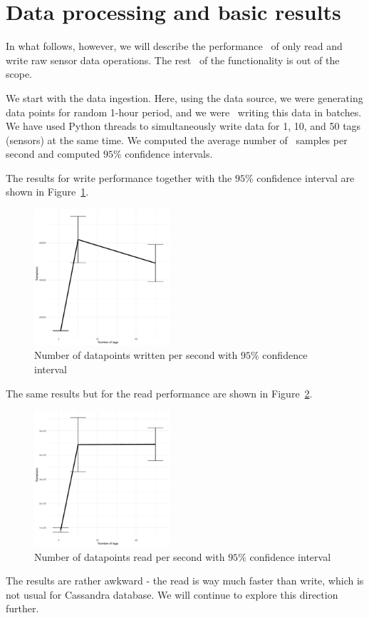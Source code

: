 \section{Data processing and basic results}
\label{section:results}


In what follows, however, we will describe the performance 
of only read and write raw sensor data operations. The rest 
of the functionality is out of the scope.

We start with the data ingestion. Here, using the data source,
we were generating data points for random 1-hour period, and we were 
writing this data in batches. We have used Python threads
to simultaneously write data for 1, 10, and 50 tags (sensors)
at the same time. We computed the average number of 
samples per second and computed $95\%$ confidence intervals.

The results for write performance together with the $95\%$ confidence 
interval are shown in Figure~\ref{fig:write}. 

\begin{figure}[!hbt]\centering
  \includegraphics[width=0.45\textwidth]{graphics/write.pdf}
  \caption{Number of datapoints written per second with $95\%$ confidence interval}
  \label{fig:write}
\end{figure}

The same results but for the read performance are shown in Figure~\ref{fig:read}.

\begin{figure}[!hbt]\centering
  \includegraphics[width=0.45\textwidth]{graphics/read.pdf}
  \caption{Number of datapoints read per second with $95\%$ confidence interval}
  \label{fig:read}
\end{figure}

The results are rather awkward - the read is way much faster than write, which is not
usual for Cassandra database. We will continue to explore this direction further.
